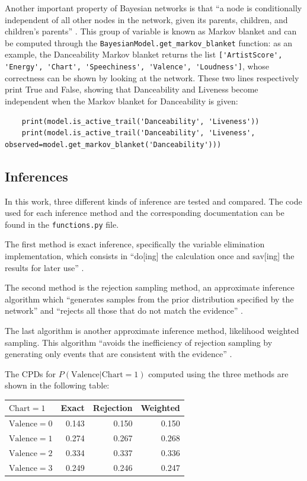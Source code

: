 \documentclass[a4paper, 12pt]{article}
\begin{document}
Another important property of Bayesian networks is that ``a node is conditionally independent of all other nodes in the network, given its parents, children, and children’s parents'' \cite{probabilistic-reasoning}. This group of variable is known as Markov blanket and can be computed through the \verb|BayesianModel.get_markov_blanket| function: as an example, the Danceability Markov blanket returns the list \verb|['ArtistScore', 'Energy', 'Chart', 'Speechiness', 'Valence', 'Loudness']|, whose correctness can be shown by looking at the network. These two lines respectively print True and False, showing that Danceability and Liveness become independent when the Markov blanket for Danceability is given:
\begin{verbatim}
    print(model.is_active_trail('Danceability', 'Liveness'))
    print(model.is_active_trail('Danceability', 'Liveness', observed=model.get_markov_blanket('Danceability')))
\end{verbatim}


\subsection{Inferences}

In this work, three different kinds of inference are tested and compared. The code used for each inference method and the corresponding documentation can be found in the \verb|functions.py| file.

The first method is exact inference, specifically the variable elimination implementation, which consists in ``do[ing] the calculation once and sav[ing] the results for later use'' \cite{probabilistic-reasoning}.

The second method is the rejection sampling method, an approximate inference algorithm which ``generates samples from the prior distribution specified by the network'' \cite{probabilistic-reasoning} and ``rejects all those that do not match the evidence'' \cite{probabilistic-reasoning}.

The last algorithm is another approximate inference method, likelihood weighted sampling. This algorithm ``avoids the inefficiency of rejection sampling by generating only events that are consistent with the evidence'' \cite{probabilistic-reasoning}.

The CPDs for $P\left(\mathrm{Valence} | \mathrm{Chart} = 1\right)$ computed using the three methods are shown in the following table:
\begin{center}
    \begin{tabular}{lrrr}
        \toprule
        $\mathrm{Chart} = 1$   & Exact & Rejection & Weighted \\
        \midrule
        $\mathrm{Valence} = 0$ & 0.143 & 0.150     & 0.150    \\
        $\mathrm{Valence} = 1$ & 0.274 & 0.267     & 0.268    \\
        $\mathrm{Valence} = 2$ & 0.334 & 0.337     & 0.336    \\
        $\mathrm{Valence} = 3$ & 0.249 & 0.246     & 0.247    \\
        \bottomrule
    \end{tabular}
\end{center}
\end{document}
